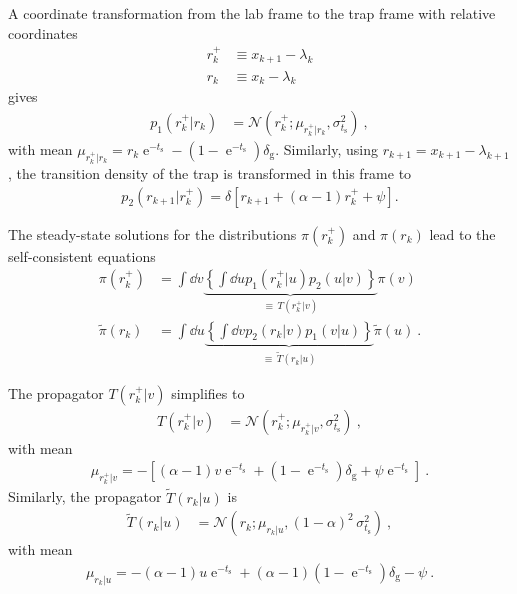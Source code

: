 \documentclass[%
reprint,
bibnotes, amsmath, amssymb, aps, pre,
 showkeys,
floatfix
]{revtex4-2}
\newcommand{\mrm}{\mathrm}
\newcommand{\mcal}{\mathcal}
\newcommand{\pr}[1]{\left(#1\right)} %
\newcommand{\sr}[1]{\left[#1\right]} %
\newcommand{\br}[1]{\left\{#1\right\}} %
\newcommand{\dg}{\delta_{\mrm{g}}}
\newcommand{\ts}{t_{\mrm{s}}}
\newcommand{\xk}{x_{k}}
\newcommand{\xkp}{x_{k+1}}
\newcommand{\lk}{\lambda_{k}}
\newcommand{\lkp}{\lambda_{k+1}}
\newcommand{\xkr}{r_{k}}
\newcommand{\xkrp}{r_{k+1}}
\newcommand{\xkpr}{r_{k}^{+}}
\DeclareMathOperator{\e}{e}
\begin{document}
A coordinate transformation from the lab frame to the trap frame with relative coordinates
\begin{subequations}
    \begin{align}
        \xkpr &\equiv \xkp-\lk\\
        \xkr &\equiv \xk-\lk
    \end{align}
\end{subequations}
gives
\begin{align}
    p_{1}\pr{\xkpr|\xkr} &= \mcal{N}\pr{\xkpr; \mu_{\xkpr|\xkr}, \sigma_{\ts}^{2}}\ ,
\end{align}
with mean $\mu_{\xkpr|\xkr} = \xkr\e^{-\ts}-\pr{1-\e^{-\ts}}\dg$.
Similarly, using $\xkrp = \xkp-\lkp$, the transition density of the trap is transformed in this frame to
\begin{align}
    p_{2}\pr{\xkrp|\xkpr} = \delta\sr{\xkrp + \pr{\alpha-1}\xkpr + \psi}.
\end{align}

The steady-state solutions for the distributions $\pi\pr{\xkpr}$ and $\pi\pr{\xkr}$ lead to the self-consistent equations
\begin{subequations}\label{eq:self_consistent_eqs}
    \begin{align}
        \pi\pr{\xkpr} &= \int\dd{v}\underbrace{\br{\int\dd{u}p_{1}\pr{\xkpr|u}p_{2}\pr{u|v}}}_{\equiv \, T\pr{\xkpr|v}}\pi\pr{v}\label{eq:self_consistent_eqs1}\\
        \tilde\pi\pr{\xkr} &= \int\dd{u}\underbrace{\br{\int\dd{v}p_{2}\pr{\xkr|v}p_{1}\pr{v|u}}}_{\equiv \, \tilde{T}\pr{\xkr|u}}\tilde\pi\pr{u}\ .\label{eq:self_consistent_eqs2}
    \end{align}
\end{subequations}

The propagator $T\pr{\xkpr|v}$ simplifies to
\begin{align}
    T\pr{\xkpr|v} &= \mcal{N}\pr{\xkpr;\mu_{\xkpr|v},\sigma_{\ts}^{2}}\ ,
\end{align}
with mean
\begin{align}
    \mu_{\xkpr|v} = -\sr{\pr{\alpha-1}v\e^{-\ts}+\pr{1-\e^{-\ts}}\dg + \psi\e^{-\ts}}\ .
\end{align} 
Similarly, the propagator $\tilde{T}\pr{\xkr|u}$ is
\begin{align}
    \tilde{T}\pr{\xkr|u} &= \mcal{N}\pr{\xkr;\mu_{\xkr|u},(1-\alpha)^2\,\sigma_{\ts}^{2}}\ ,
\end{align}
with mean
\begin{align}
    \mu_{\xkr|u} = -\pr{\alpha-1}u\e^{-\ts} + \pr{\alpha-1}\pr{1-\e^{-\ts}}\dg - \psi\ .
\end{align}
\end{document}
